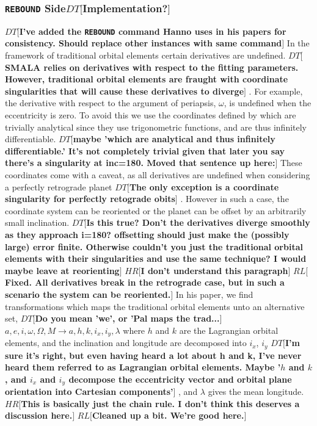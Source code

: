 \documentclass{aa}
\def\memohr#1{\color{blue}$HR[${\bf #1}$]$ \color{black}}
\def\memodt#1{\color{green}$DT[${\bf #1}$]$ \color{black}}
\def\memorl#1{\color{gray}$RL[${\bf #1}$]$ \color{black}}
\newcommand{\reb}{{\sc \tt REBOUND}\xspace}
\begin{document}
\subsubsection{\reb Side\memodt{Implementation?}}\label{analytical}
\memodt{I've added the \reb command Hanno uses in his papers for consistency. Should replace other instances with same command}
In the framework of traditional orbital elements certain derivatives are undefined. \memodt{SMALA relies on derivatives with respect to the fitting parameters. However, traditional orbital elements are fraught with coordinate singularities that will cause these derivatives to diverge}. For example, the derivative with respect to the argument of periapsis, $\omega$, is undefined when the eccentricity is zero. 
To avoid this we use the coordinates defined by \cite{Pl2009} which are trivially analytical since they use trigonometric functions, and are thus infinitely differentiable. \memodt{maybe 'which are analytical and thus infinitely differentiable.' It's not completely trivial given that later you say there's a singularity at inc=180. Moved that sentence up here:}
These coordinates come with a caveat, as all derivatives are undefined when considering a perfectly retrograde planet \memodt{The only exception is a coordinate singularity for perfectly retograde obits}. However in such a case, the coordinate system can be reoriented or the planet can be offset by an arbitrarily small inclination. \memodt{Is this true? Don't the derivatives diverge smoothly as they approach i=180? offsetting should just make the (possibly large) error finite. Otherwise couldn't you just the traditional orbital elements with their singularities and use the same technique? I would maybe leave at reorienting}
\memohr{I don't understand this paragraph}
\memorl{Fixed. All derivatives break in the retrograde case, but in such a scenario the system can be reoriented.}
In his paper, we find transformations which maps the traditional orbital elements unto an alternative set, \memodt{Do you mean 'we', or 'Pal maps the trad...} $a, e, i, \omega, \Omega, M \to a, h, k, i_x, i_y, \lambda$ where $h$ and $k$ are the Lagrangian orbital elements, and the inclination and longitude are decomposed into $i_x$, $i_y$ \memodt{I'm sure it's right, but even having heard a lot about h and k, I've never heard them referred to as Lagrangian orbital elements. Maybe '$h$ and $k$, and $i_x$ and $i_y$ decompose the eccentricity vector and orbital plane orientation into Cartesian components'}, and $\lambda$ gives the mean longitude. 
\memohr{This is basically just the chain rule. I don't think this deserves a discussion here.}
\memorl{Cleaned up a bit. We're good here.}
\end{document}
